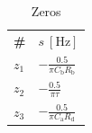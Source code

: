 \begin{table}[h]
\centering
\begin{tabular}[c]{ll}
\textbf{\#} & \textbf{$s\ [\mathrm{Hz}]$} \\ 
\rowcolor{myyellow}
$z_{1}$ &$- \frac{0.5}{\pi C_{\mathrm{b}} R_{\mathrm{b}}}$ \\ 
$z_{2}$ &$- \frac{0.5}{\pi \tau}$ \\ 
\rowcolor{myyellow}
$z_{3}$ &$- \frac{0.5}{\pi C_{\mathrm{a}} R_{\mathrm{d}}}$ \\ 
\end{tabular}
\caption{Zeros}
\end{table}

